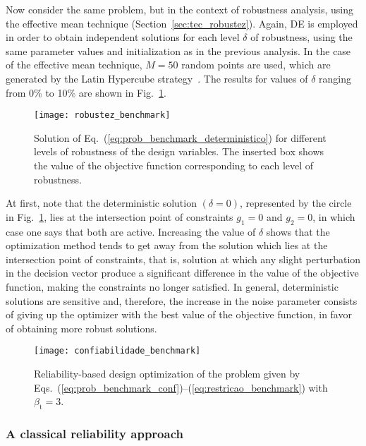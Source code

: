 \documentclass[final,5p,times,twocolumn,numbers]{elsarticle}
\begin{document}
Now consider the same problem, but in the context of robustness analysis, using the effective mean technique (Section~\ref{sec:tec_robustez}). Again, DE is employed in order to obtain independent solutions for each level $ \delta $ of robustness, using the same parameter values and initialization as in the previous analysis. In the case of the effective mean technique, $ M = 50 $ random points are used, which are generated by the Latin Hypercube strategy~\cite{bib:mencik2016}. The results for values of $ \delta $ ranging from 0\% to 10\% are shown in Fig.~\ref{fig:robustez_benchmark}.

\begin{figure}[!ht]
    \centering
    \texttt{[image: robustez\_benchmark]}
    \caption{Solution of Eq.~(\ref{eq:prob_benchmark_deterministico}) for different levels of robustness of the design variables. The inserted box shows the value of the objective function corresponding to each level of robustness.}
    \label{fig:robustez_benchmark}
\end{figure}

At first, note that the deterministic solution $ \left( \delta = 0 \right) $, represented by the circle in Fig.~\ref{fig:robustez_benchmark}, lies at the intersection point of constraints $ g_{1} = 0 $ and $ g_{2} = 0 $, in which case one says that both are active. Increasing the value of $ \delta $ shows that the optimization method tends to get away from the solution which lies at the intersection point of constraints, that is, solution at which any slight perturbation in the decision vector produce a significant difference in the value of the objective function, making the constraints no longer satisfied. In general, deterministic solutions are sensitive and, therefore, the increase in the noise parameter consists of giving up the optimizer with the best value of the objective function, in favor of obtaining more robust solutions.

\begin{figure}[!hb]
    \centering
    \texttt{[image: confiabilidade\_benchmark]}
    \caption{Reliability-based design optimization of the problem given by Eqs.~(\ref{eq:prob_benchmark_conf})--(\ref{eq:restricao_benchmark}) with $ \beta_{\mathrm{t}} = 3 $.}
    \label{fig:confiabilidade_benchmark}
\end{figure}

\subsubsection{A classical reliability approach}
\end{document}
